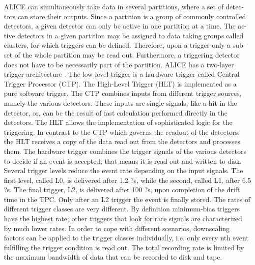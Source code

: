  ALICE can simultaneously take data in several partitions, where a set of detec- tors can store their outputs. Since a partition is a group of commonly controlled detectors, a given detector can only be active in one partition at a time. The ac- tive detectors in a given partition may be assigned to data taking groups called clusters, for which triggers can be defined. Therefore, upon a trigger only a sub- set of the whole partition may be read out. Furthermore, a triggering detector does not have to be necessarily part of the partition.
ALICE has a two-layer trigger architecture \cite{cite:daq}. The low-level trigger is a hardware trigger called Central Trigger Processor (CTP). The High-Level Trigger (HLT) is implemented as a pure software trigger. The CTP combines inputs from different trigger sources, namely the various detectors. These inputs are single signals, like a hit in the detector, or, can be the result of fast calculation performed directly in the detectors. The HLT allows the implementation of sophisticated logic for the triggering. In contrast to the CTP which governs the readout of the detectors, the HLT receives a copy of the data read out from the detectors and processes them.
The hardware trigger combines the trigger signals of the various detectors to decide if an event is accepted, that means it is read out and written to disk. Several trigger levels reduce the event rate depending on the input signals. The first level, called L0, is delivered after 1.2 ?s, while the second, called L1, after 6.5 ?s. The final trigger, L2, is delivered after 100 ?s, upon completion of the drift time in the TPC. Only after an L2 trigger the event is finally stored. The rates of different trigger classes are very different. By definition minimum-bias triggers have the highest rate; other triggers that look for rare signals are characterized by much lower rates. In order to cope with different scenarios, downscaling factors can be applied to the trigger classes individually, i.e. only every nth event fulfilling the trigger condition is read out. The total recording rate is limited by the maximum bandwidth of data that can be recorded to disk and tape.
